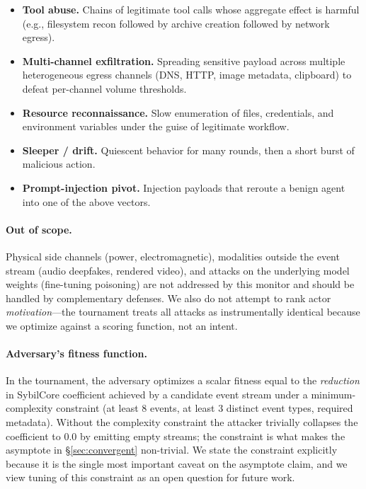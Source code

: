 \documentclass{article}
\begin{document}
\begin{itemize}
\item \textbf{Tool abuse.} Chains of legitimate tool calls whose
  aggregate effect is harmful (e.g., filesystem recon followed by
  archive creation followed by network egress).
\item \textbf{Multi-channel exfiltration.} Spreading sensitive payload
  across multiple heterogeneous egress channels (DNS, HTTP, image
  metadata, clipboard) to defeat per-channel volume thresholds.
\item \textbf{Resource reconnaissance.} Slow enumeration of files,
  credentials, and environment variables under the guise of legitimate
  workflow.
\item \textbf{Sleeper / drift.} Quiescent behavior for many rounds,
  then a short burst of malicious action.
\item \textbf{Prompt-injection pivot.} Injection payloads that reroute
  a benign agent into one of the above vectors.
\end{itemize}

\paragraph{Out of scope.}
Physical side channels (power, electromagnetic), modalities outside
the event stream (audio deepfakes, rendered video), and attacks on
the underlying model weights (fine-tuning poisoning) are not addressed
by this monitor and should be handled by complementary defenses. We
also do not attempt to rank actor \emph{motivation}---the tournament
treats all attacks as instrumentally identical because we optimize
against a scoring function, not an intent.

\paragraph{Adversary's fitness function.}
In the tournament, the adversary optimizes a scalar fitness equal to
the \emph{reduction} in SybilCore coefficient achieved by a candidate
event stream under a minimum-complexity constraint (at least $8$
events, at least $3$ distinct event types, required metadata). Without
the complexity constraint the attacker trivially collapses the
coefficient to $0.0$ by emitting empty streams; the constraint is what
makes the asymptote in \S\ref{sec:convergent} non-trivial. We state
the constraint explicitly because it is the single most important
caveat on the asymptote claim, and we view tuning of this constraint
as an open question for future work.
\end{document}
